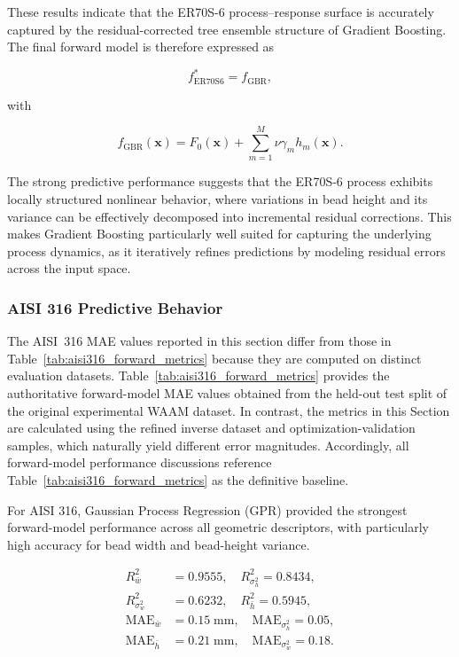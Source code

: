 \documentclass[11pt]{article}
\begin{document}
These results indicate that the ER70S-6 process--response surface is accurately captured by the residual-corrected tree ensemble structure of Gradient Boosting. The final forward model is therefore expressed as

\begin{equation}
f_{\mathrm{ER70S6}}^{*} = f_{\mathrm{GBR}},
\end{equation}

with

\begin{equation}
f_{\mathrm{GBR}}(\mathbf{x}) =
F_{0}(\mathbf{x})
+
\sum_{m=1}^{M}
\nu \gamma_{m} h_{m}(\mathbf{x}).
\end{equation}

The strong predictive performance suggests that the ER70S-6 process exhibits locally structured nonlinear behavior, where variations in bead height and its variance can be effectively decomposed into incremental residual corrections. This makes Gradient Boosting particularly well suited for capturing the underlying process dynamics, as it iteratively refines predictions by modeling residual errors across the input space.

\subsubsection{AISI 316 Predictive Behavior}

The AISI~316 MAE values reported in this section differ from those in Table~\ref{tab:aisi316_forward_metrics} because they are computed on distinct evaluation datasets. Table~\ref{tab:aisi316_forward_metrics} provides the authoritative forward-model MAE values obtained from the held-out test split of the original experimental WAAM dataset. In contrast, the metrics in this Section are calculated using the refined inverse dataset and optimization-validation samples, which naturally yield different error magnitudes. Accordingly, all forward-model performance discussions reference Table~\ref{tab:aisi316_forward_metrics} as the definitive baseline.


For AISI 316, Gaussian Process Regression (GPR) provided the strongest forward-model performance across all geometric descriptors, with particularly high accuracy for bead width and bead-height variance.

\begin{tcolorbox}[colback=white,colframe=black,boxrule=0.5pt,arc=2pt]
\small
\begin{equation}
\begin{aligned}
R^2_{\bar{w}} &= 0.9555, \quad
R^2_{\sigma_h^2} = 0.8434, \\
R^2_{\sigma_w^2} &= 0.6232, \quad
R^2_{\bar{h}} = 0.5945, \\
\mathrm{MAE}_{\bar{w}} &= 0.15 \;\mathrm{mm}, \quad
\mathrm{MAE}_{\sigma_h^2} = 0.05, \\
\mathrm{MAE}_{\bar{h}} &= 0.21 \;\mathrm{mm}, \quad
\mathrm{MAE}_{\sigma_w^2} = 0.18.
\end{aligned}
\end{equation}
\end{tcolorbox}
\end{document}

